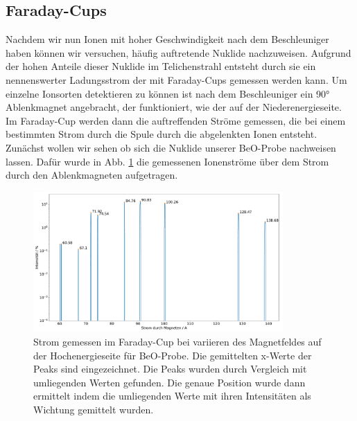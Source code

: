 \subsection{Faraday-Cups}
Nachdem wir nun Ionen mit hoher Geschwindigkeit nach dem Beschleuniger haben können wir versuchen, häufig auftretende Nuklide nachzuweisen.
Aufgrund der hohen Anteile dieser Nuklide im Telichenstrahl entsteht durch sie ein nennenswerter Ladungsstrom der mit Faraday-Cups gemessen werden kann.
Um einzelne Ionsorten detektieren zu können ist nach dem Beschleuniger ein \ang{90} Ablenkmagnet angebracht, der funktioniert, wie der auf der Niederenergieseite.
Im Faraday-Cup werden dann die auftreffenden Ströme gemessen, die bei einem bestimmten Strom durch die Spule durch die abgelenkten Ionen entsteht.
Zunächst wollen wir sehen ob sich die Nuklide unserer BeO-Probe nachweisen lassen.
Dafür wurde in Abb. \ref{Auswertung_Bild_Faraday_Cup_BeO_HE} die gemessenen Ionenströme über dem Strom durch den Ablenkmagneten aufgetragen.
\begin{figure}[ht]
	\centering
           \includegraphics[width=0.85\textwidth]{Pictures/HEMass60-140pos153BeOTUDPract.pdf}
	\caption{Strom gemessen im Faraday-Cup bei variieren des Magnetfeldes auf der Hochenergieseite für BeO-Probe. Die gemittelten x-Werte der Peaks sind eingezeichnet. Die Peaks wurden durch Vergleich mit umliegenden Werten gefunden. Die genaue Position wurde dann ermittelt indem die umliegenden Werte mit ihren Intensitäten als Wichtung gemittelt wurden.}
	\label{Auswertung_Bild_Faraday_Cup_BeO_HE}
\end{figure}

